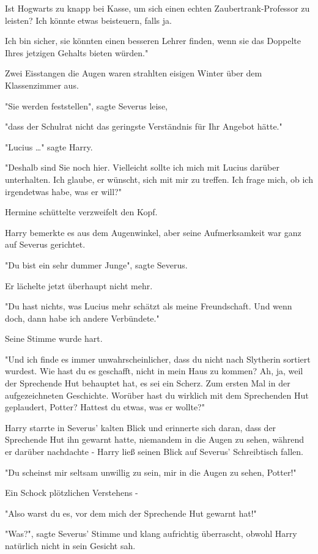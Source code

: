{Ist Hogwarts zu knapp bei Kasse, um sich einen echten Zaubertrank-Professor zu leisten? Ich könnte etwas beisteuern, falls ja.

Ich bin sicher, sie könnten einen besseren Lehrer finden, wenn sie das Doppelte Ihres jetzigen Gehalts bieten würden."

Zwei Eisstangen die Augen waren strahlten eisigen Winter über dem Klassenzimmer aus.

"Sie werden feststellen", sagte Severus leise,

"dass der Schulrat nicht das geringste Verständnis für Ihr Angebot hätte."

"Lucius …" sagte Harry.

"Deshalb sind Sie noch hier. Vielleicht sollte ich mich mit Lucius darüber unterhalten. Ich glaube, er wünscht, sich mit mir zu treffen. Ich frage mich, ob ich irgendetwas habe, was er will?"

Hermine schüttelte verzweifelt den Kopf.

Harry bemerkte es aus dem Augenwinkel, aber seine Aufmerksamkeit war ganz auf Severus gerichtet.

"Du bist ein sehr dummer Junge", sagte Severus.

Er lächelte jetzt überhaupt nicht mehr.

"Du hast nichts, was Lucius mehr schätzt als meine Freundschaft. Und wenn doch, dann habe ich andere Verbündete."

Seine Stimme wurde hart.

"Und ich finde es immer unwahrscheinlicher, dass du nicht nach Slytherin sortiert wurdest. Wie hast du es geschafft, nicht in mein Haus zu kommen? Ah, ja, weil der Sprechende Hut behauptet hat, es sei ein Scherz. Zum ersten Mal in der aufgezeichneten Geschichte. Worüber hast du wirklich mit dem Sprechenden Hut geplaudert, Potter? Hattest du etwas, was er wollte?"

Harry starrte in Severus' kalten Blick und erinnerte sich daran, dass der Sprechende Hut ihn gewarnt hatte, niemandem in die Augen zu sehen, während er darüber nachdachte - Harry ließ seinen Blick auf Severus' Schreibtisch fallen.

"Du scheinst mir seltsam unwillig zu sein, mir in die Augen zu sehen, Potter!"

Ein Schock plötzlichen Verstehens -

"Also warst du es, vor dem mich der Sprechende Hut gewarnt hat!"

"Was?", sagte Severus' Stimme und klang aufrichtig überrascht, obwohl Harry natürlich nicht in sein Gesicht sah.

}
